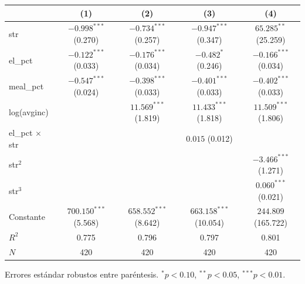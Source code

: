 
\begin{tabular}{lcccc}
\toprule
 & (1) & (2) & (3) & (4)\\
\midrule
str & $-0.998^{***}$ (0.270) & $-0.734^{***}$ (0.257) & $-0.947^{***}$ (0.347) & $65.285^{**}$ (25.259)\\
el\_pct & $-0.122^{***}$ (0.033) & $-0.176^{***}$ (0.034) & $-0.482^{*}$ (0.246) & $-0.166^{***}$ (0.034)\\
meal\_pct & $-0.547^{***}$ (0.024) & $-0.398^{***}$ (0.033) & $-0.401^{***}$ (0.033) & $-0.402^{***}$ (0.033)\\
log(avginc) &  & $11.569^{***}$ (1.819) & $11.433^{***}$ (1.818) & $11.509^{***}$ (1.806)\\
el\_pct $\times$ str &  &  & $0.015$ (0.012) & \\
str$^2$ &  &  &  & $-3.466^{***}$ (1.271)\\
str$^3$ &  &  &  & $0.060^{***}$ (0.021)\\
Constante & $700.150^{***}$ (5.568) & $658.552^{***}$ (8.642) & $663.158^{***}$ (10.054) & $244.809$ (165.722)\\
$R^2$ & 0.775 & 0.796 & 0.797 & 0.801\\
$N$ & 420 & 420 & 420 & 420\\
\bottomrule
\end{tabular}
\par\vspace{3pt}
{\footnotesize\parbox{0.9\linewidth}{\centering Errores est\'andar robustos entre par\'entesis. $^{*}p<0.10$, $^{**}p<0.05$, $^{***}p<0.01$.}}

